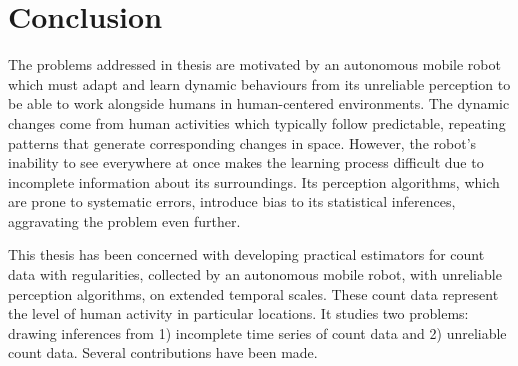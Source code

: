 \section{Conclusion}
\label{sec:conclusion}

The problems addressed in thesis are motivated by an autonomous mobile robot which must adapt and learn dynamic behaviours from its unreliable perception to be able to work alongside humans in human-centered environments. The dynamic changes come from human activities which typically follow predictable, repeating patterns that generate corresponding changes in space. However, the robot's inability to see everywhere at once makes the learning process difficult due to incomplete information about its surroundings. Its perception algorithms, which are prone to systematic errors, introduce bias to its statistical inferences, aggravating the problem even further.   

This thesis has been concerned with developing practical estimators for count data with regularities, collected by an autonomous mobile robot, with unreliable perception algorithms, on extended temporal scales. These count data represent the level of human activity in particular locations. It studies two problems: drawing inferences from 1) incomplete time series of count data and 2) unreliable count data. Several contributions have been made.

